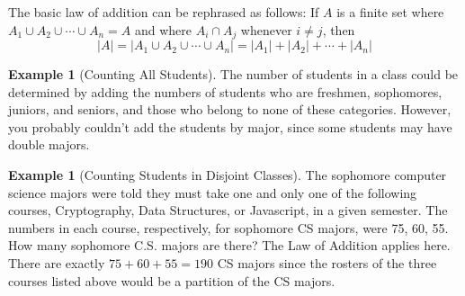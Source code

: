 \documentclass[10pt,]{book}
\theoremstyle{plain}
\theoremstyle{definition}
\theoremstyle{definition}
\newtheorem{example}[theorem]{Example}
\theoremstyle{definition}
\begin{document}
 The basic law of addition can be rephrased as follows: If \(A\)  is a finite set where \(A_1 \cup A_2 \cup \cdots \cup A_n = A\) and where \(A_i \cap A_j\) whenever \(i \neq j\), then
 \begin{equation*}\lvert A \rvert = \lvert A_1 \cup A_2 \cup  \cdots \cup A_n  \rvert = \lvert A_1 \rvert + \lvert A_2 \rvert + \cdots + \lvert A_n \rvert \end{equation*}
%
\begin{example}[Counting All Students]\label{counting-all-students}
The number of students in a class could be determined by adding the numbers of students who are freshmen, sophomores, juniors, and seniors, and those who belong to none of these categories. However, you probably couldn't add the students by major, since some students may have double majors.
%
\end{example}
\begin{example}[Counting Students in Disjoint Classes]\label{student-counting-disjoint}
The sophomore computer science majors were told they must take one and only one of the following courses, Cryptography, Data Structures, or Javascript, in a given semester. The numbers in each course, respectively, for sophomore CS majors, were 75, 60, 55. How many sophomore C.S. majors are there? The Law of Addition applies here. There are exactly \(75 + 60 + 55 = 190\) CS majors since the rosters of the three courses listed above would be a partition of the CS majors.%
\end{example}
\end{document}
